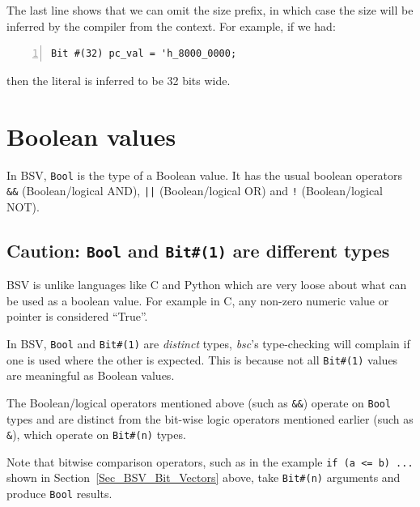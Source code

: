 The last line shows that we can omit the size prefix, in which case
the size will be inferred by the compiler from the context. For
example, if we had:

{\small
\begin{Verbatim}[frame=single, numbers=left]
   Bit #(32) pc_val = 'h_8000_0000;
\end{Verbatim}
}

then the literal is inferred to be 32 bits wide.


\section{Boolean values}

\label{Sec_BSV_Boolean_values}


In BSV, \verb|Bool| is the type of a Boolean value. It has the usual
boolean operators \verb|&&| (Boolean/logical AND), \verb'||'
(Boolean/logical OR) and \verb|!| (Boolean/logical NOT).


\subsection{Caution: {\tt Bool} and {\tt Bit\#(1)} are different types}

BSV is unlike languages like C and Python which are very loose about
what can be used as a boolean value.  For example in C, any non-zero
numeric value or pointer is considered ``True''.

In BSV, \verb|Bool| and \verb|Bit#(1)| are \emph{distinct} types,
{\ie} \emph{bsc}'s type-checking will complain if one is used where
the other is expected.  This is because not all \verb|Bit#(1)| values
are meaningful as Boolean values.

The Boolean/logical operators mentioned above (such as \verb|&&|)
operate on \verb|Bool| types and are distinct from the bit-wise logic
operators mentioned earlier (such as \verb|&|), which operate on
\verb|Bit#(n)| types.

Note that bitwise comparison operators, such as in the example
\verb|if (a <= b) ...| shown in Section~\ref{Sec_BSV_Bit_Vectors}
above, take \verb|Bit#(n)| arguments and produce \verb|Bool| results.

